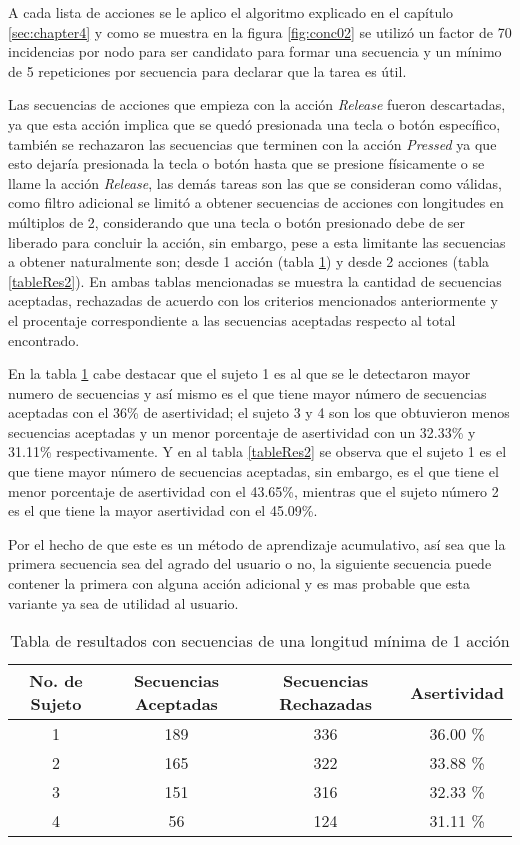 A cada lista de acciones se le aplico el algoritmo explicado en el cap\'itulo \ref{sec:chapter4} y como se muestra en la figura \ref{fig:conc02} se utiliz\'o un factor de 70 incidencias por nodo para ser candidato para formar una secuencia y un m\'inimo de 5 repeticiones por secuencia para declarar que la tarea es \'util. 


Las secuencias de acciones que empieza con la acci\'on \emph{Release} fueron descartadas, ya que esta acci\'on implica que se qued\'o presionada una tecla o bot\'on espec\'ifico, tambi\'en se rechazaron las secuencias que terminen con la acci\'on \emph{Pressed} ya que esto dejar\'ia presionada la tecla o bot\'on hasta que se presione f\'isicamente o se llame la acci\'on \emph{Release}, las dem\'as tareas son las que se consideran como v\'alidas, como filtro adicional se limit\'o a obtener secuencias de acciones con longitudes en m\'ultiplos de 2, considerando que una tecla o bot\'on presionado debe de ser liberado para concluir la acci\'on, sin embargo, pese a esta limitante las secuencias a obtener naturalmente son; desde 1 acci\'on (tabla \ref{tableRes1}) y desde 2 acciones (tabla \ref{tableRes2}). En ambas tablas mencionadas se muestra la cantidad de secuencias aceptadas, rechazadas de acuerdo con los criterios mencionados anteriormente y el procentaje correspondiente a las secuencias aceptadas respecto al total encontrado.


En la tabla \ref{tableRes1} cabe destacar que el sujeto 1 es al que se le detectaron mayor numero de secuencias y as\'i mismo es el que tiene mayor n\'umero de secuencias aceptadas con el 36\% de asertividad; el sujeto 3 y 4 son los que obtuvieron menos secuencias aceptadas y un menor porcentaje de asertividad con un 32.33\% y 31.11\% respectivamente. Y en al tabla \ref{tableRes2} se observa que el sujeto 1 es el que tiene mayor n\'umero de secuencias aceptadas, sin embargo, es el que tiene el menor porcentaje de asertividad con el 43.65\%, mientras que el sujeto n\'umero 2 es el que tiene la mayor asertividad con el 45.09\%.


Por el hecho de que este es un m\'etodo de aprendizaje acumulativo, as\'i sea que la primera secuencia sea del agrado del usuario o no, la siguiente secuencia puede contener la primera con alguna acci\'on adicional y es mas probable que esta variante ya sea de utilidad al usuario. 


\begin{table}[]
\centering
\begin{tabular}{cccc}
\hline
		No. de Sujeto	&	Secuencias Aceptadas	&   Secuencias Rechazadas	&	Asertividad		\\ \hline
		1				&	189						&	336						&	36.00 \%		\\
		2				&	165						&	322						&	33.88 \%		\\
		3				&	151						&	316						&	32.33 \%		\\
		4				&	56						&	124						&	31.11 \%		\\
\hline
\end{tabular}
\caption{Tabla de resultados con secuencias de una longitud m\'inima de 1 acci\'on}
\label{tableRes1}
\end{table}



